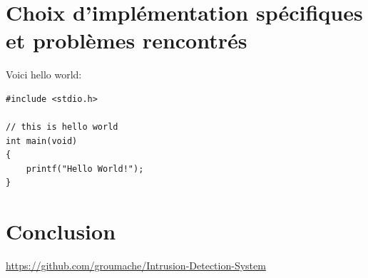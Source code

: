 \documentclass[a4paper]{article}
\begin{document}
\section{Choix d'implémentation spécifiques et problèmes rencontrés}






Voici hello world:

\begin{lstlisting}[style=CStyle]
#include <stdio.h>

// this is hello world
int main(void)
{
    printf("Hello World!"); 
}
\end{lstlisting}










\section{Conclusion}




















\newpage \tableofcontents \listoffigures
\begin{thebibliography}{9}
 {\small \url{https://github.com/groumache/Intrusion-Detection-System}}
\end{thebibliography}
\end{document}
